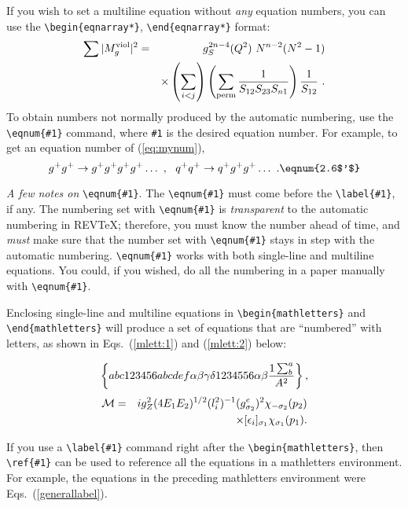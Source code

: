 If you wish to set a multiline equation without {\em any\/} equation numbers,
you can use the \verb+\begin{eqnarray*}+,
\verb+\end{eqnarray*}+ format:
\begin{eqnarray*}
\sum \vert M^{\rm viol}_g \vert ^2&=&g^{2n-4}_S(Q^2)~N^{n-2}
        (N^2-1)\\
 & &\times \left( \sum_{i<j}\right)
 \left( \sum_{\rm perm}
 {1 \over S_{12}S_{23}S_{n1}}\right)
 {1 \over S_{12}}~.
\end{eqnarray*}
To obtain numbers not normally produced by the automatic numbering,
use the \verb+\eqnum{#1}+ command, where \verb+#1+ is the desired
equation number. For example, to get an equation number of
(\ref{eq:mynum}),
\begin{equation}
g^+g^+ \rightarrow g^+g^+g^+g^+ \dots ~,~~q^+q^+\rightarrow
q^+g^+g^+ \dots ~. \eqnum{2.6$'$}\label{eq:mynum}
\end{equation}

{\it A few notes on} \verb=\eqnum{#1}=.
The \verb+\eqnum{#1}+ must come before the \verb+\label{#1}+, if any.
The numbering set with \verb+\eqnum{#1}+ is {\it transparent} to the
automatic numbering in REV\TeX{}; therefore,
you must know the number ahead of time, and {\it must\/} make
sure that the number set with \verb+\eqnum{#1}+ stays in step
with the automatic numbering.
\verb+\eqnum{#1}+ works with both single-line and multiline equations.
You could, if you wished, do all the numbering in a paper
manually with \verb+\eqnum{#1}+.

Enclosing single-line and multiline equations in
\verb+\begin{mathletters}+ and \verb+\end{mathletters}+ will produce
a set of equations that are ``numbered'' with letters, as shown
in Eqs.\ (\ref{mlett:1}) and (\ref{mlett:2}) below:
\begin{mathletters}
\label{generallabel}
\begin{equation}
\left\{abc123456abcdef\alpha\beta\gamma\delta%
1234556\alpha\beta{1\sum^{a}_{b}\over A^2}\right\},\label{mlett:1}
\end{equation}
\begin{eqnarray}
{\cal M}=&&ig_Z^2(4E_1E_2)^{1/2}(l_i^2)^{-1}
(g_{\sigma_2}^e)^2\chi_{-\sigma_2}(p_2)\nonumber\\
&&\times
[\epsilon_i]_{\sigma_1}\chi_{\sigma_1}(p_1).\label{mlett:2}
\end{eqnarray}
\end{mathletters}
If you use a \verb+\label{#1}+ command right after the
\verb+\begin{mathletters}+, then \verb+\ref{#1}+ can be used to reference
all the equations in a mathletters environment. For example, the equations
in the preceding mathletters environment were Eqs.\ (\ref{generallabel}).

